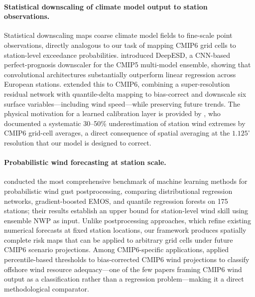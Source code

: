 \documentclass{article}
\begin{document}
\paragraph{Statistical downscaling of climate model output to station observations.}
Statistical downscaling maps coarse climate model fields to fine-scale point observations, directly analogous to our task of mapping CMIP6 grid cells to station-level exceedance probabilities. \cite{banomedinaDeepESD2022} introduced DeepESD, a CNN-based perfect-prognosis downscaler for the CMIP5 multi-model ensemble, showing that convolutional architectures substantially outperform linear regression across European stations. \cite{busterSRDRN2024} extended this to CMIP6, combining a super-resolution residual network with quantile-delta mapping to bias-correct and downscale six surface variables---including wind speed---while preserving future trends. The physical motivation for a learned calibration layer is provided by \cite{shenCMIP6Wind2022}, who documented a systematic 30--50\% underestimation of station wind extremes by CMIP6 grid-cell averages, a direct consequence of spatial averaging at the $1.125^\circ$ resolution that our model is designed to correct.

\paragraph{Probabilistic wind forecasting at station scale.}
\cite{schulzLerchWindGusts2022} conducted the most comprehensive benchmark of machine learning methods for probabilistic wind gust postprocessing, comparing distributional regression networks, gradient-boosted EMOS, and quantile regression forests on 175 stations; their results establish an upper bound for station-level wind skill using ensemble NWP as input. Unlike postprocessing approaches, which refine existing numerical forecasts at fixed station locations, our framework produces spatially complete risk maps that can be applied to arbitrary grid cells under future CMIP6 scenario projections. Among CMIP6-specific applications, \cite{sorianoCMIP6offshore2023} applied percentile-based thresholds to bias-corrected CMIP6 wind projections to classify offshore wind resource adequacy---one of the few papers framing CMIP6 wind output as a classification rather than a regression problem---making it a direct methodological comparator.
\end{document}

